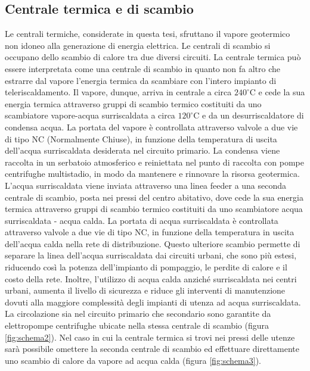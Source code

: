 \documentclass[laurea,oneside,11pt]{USiena_tesiLM}
\begin{document}
\subsection{Centrale termica e di scambio}
Le centrali termiche, considerate in questa tesi, sfruttano il vapore geotermico non idoneo alla generazione di energia elettrica. Le centrali di scambio si occupano dello scambio di calore tra due diversi circuiti. La centrale termica può essere interpretata come una centrale di scambio in quanto non fa altro che estrarre dal vapore l'energia termica da scambiare con l'intero impianto di teleriscaldamento. Il vapore, dunque, arriva in centrale a circa $240 ^{\circ}$C e cede la sua energia termica attraverso gruppi di scambio termico costituiti da uno scambiatore vapore-acqua surriscaldata a circa $120 ^{\circ}$C e da un desurriscaldatore di condensa acqua. La portata del vapore è controllata attraverso  valvole a due vie di tipo NC (Normalmente Chiuse), in funzione della temperatura  di uscita dell'acqua surriscaldata desiderata nel circuito primario. La condensa viene raccolta in un serbatoio atmosferico e reiniettata nel punto di raccolta con pompe centrifughe multistadio, in modo da mantenere e rinnovare la risorsa geotermica. L'acqua surriscaldata viene inviata attraverso una linea feeder a una seconda centrale di scambio, posta nei pressi del centro abitativo, dove cede la sua energia termica attraverso gruppi di scambio termico costituiti da uno scambiatore acqua surriscaldata - acqua calda. La portata di acqua surriscaldata è controllata attraverso valvole a due vie di tipo NC, in funzione della temperatura in uscita dell'acqua calda nella rete di distribuzione. Questo ulteriore scambio permette di separare la linea dell'acqua surriscaldata  dai circuiti urbani, che sono più estesi, riducendo così la potenza dell'impianto di pompaggio, le perdite di calore e il costo della rete. Inoltre, l'utilizzo di acqua calda anziché surriscaldata nei centri urbani, aumenta il livello di sicurezza e riduce gli interventi di manutenzione dovuti alla maggiore complessità degli impianti di utenza ad acqua surriscaldata. La circolazione sia nel circuito primario che secondario sono garantite da elettropompe centrifughe ubicate nella stessa centrale di scambio (figura \ref{fig:schema2}).
Nel caso in cui la centrale termica si trovi nei pressi delle utenze sarà possibile omettere la seconda centrale di scambio ed effettuare direttamente uno scambio di calore da vapore ad acqua calda (figura \ref{fig:schema3}).
\end{document}
